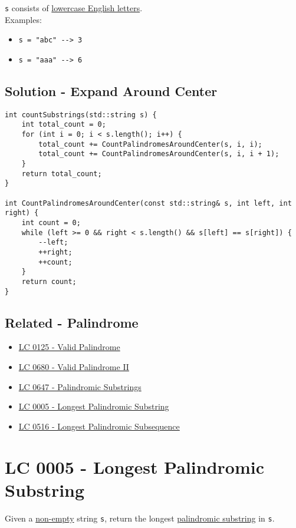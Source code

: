 {{\colorbox{CodeBackground}{\lstinline|s|}} consists of \ul{lowercase English letters}.\\

Examples:
\begin{itemize}
	\item {\colorbox{CodeBackground}{\lstinline|s = "abc" --> 3|}}
	\item {\colorbox{CodeBackground}{\lstinline|s = "aaa" --> 6|}}
\end{itemize}

\subsection*{Solution - Expand Around Center}
\begin{lstlisting}
int countSubstrings(std::string s) {
	int total_count = 0;
	for (int i = 0; i < s.length(); i++) {
		total_count += CountPalindromesAroundCenter(s, i, i);
		total_count += CountPalindromesAroundCenter(s, i, i + 1);
	}
	return total_count;
}

int CountPalindromesAroundCenter(const std::string& s, int left, int right) {
	int count = 0;
	while (left >= 0 && right < s.length() && s[left] == s[right]) {
		--left;
		++right;
		++count;
	}
	return count;
}
\end{lstlisting}

\subsection*{Related - Palindrome}
\begin{itemize}
	\item \hyperref[lc0125]{LC 0125 - Valid Palindrome}
 	\item \hyperref[lc0680]{LC 0680 - Valid Palindrome II}
	\item \hyperref[lc0647]{LC 0647 - Palindromic Substrings}
	\item \hyperref[lc0005]{LC 0005 - Longest Palindromic Substring}
	\item \hyperref[lc0516]{LC 0516 - Longest Palindromic Subsequence}
\end{itemize}

\section{LC 0005 - Longest Palindromic Substring}\label{lc0005}
Given a \ul{non-empty} string {\colorbox{CodeBackground}{\lstinline|s|}}, return the longest \ul{palindromic substring} in {\colorbox{CodeBackground}{\lstinline|s|}}.\\

}

